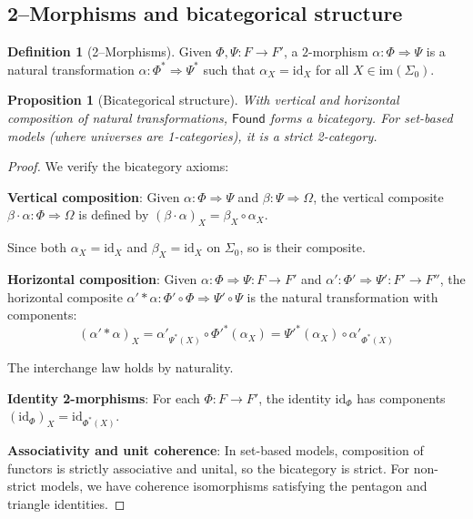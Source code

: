 \documentclass[11pt]{article}
\newtheorem{proposition}[theorem]{Proposition}
\theoremstyle{definition}
\newtheorem{definition}[theorem]{Definition}
\theoremstyle{remark}
\newcommand{\Found}{\mathsf{Found}}
\begin{document}
\subsection{2--Morphisms and bicategorical structure}\label{ssec:Found-2mor}

\begin{definition}[2--Morphisms]
Given \(\Phi,\Psi:F\to F'\), a \(2\)-morphism \(\alpha:\Phi\Rightarrow\Psi\) is a natural transformation \(\alpha:\Phi^*\Rightarrow\Psi^*\) such that \(\alpha_X = \text{id}_X\) for all \(X \in \text{im}(\Sigma_0)\).
\end{definition}

\begin{proposition}[Bicategorical structure]\label{prop:bicat}
With vertical and horizontal composition of natural transformations, \(\Found\) forms a bicategory. For set-based models (where universes are 1-categories), it is a strict 2-category.
\end{proposition}

\begin{proof}
We verify the bicategory axioms:

\textbf{Vertical composition}: Given \(\alpha: \Phi \Rightarrow \Psi\) and \(\beta: \Psi \Rightarrow \Omega\), the vertical composite \(\beta \cdot \alpha: \Phi \Rightarrow \Omega\) is defined by \((\beta \cdot \alpha)_X = \beta_X \circ \alpha_X\).

Since both \(\alpha_X = \text{id}_X\) and \(\beta_X = \text{id}_X\) on \(\Sigma_0\), so is their composite.

\textbf{Horizontal composition}: Given \(\alpha: \Phi \Rightarrow \Psi: F \to F'\) and \(\alpha': \Phi' \Rightarrow \Psi': F' \to F''\), the horizontal composite \(\alpha' * \alpha: \Phi' \circ \Phi \Rightarrow \Psi' \circ \Psi\) is the natural transformation with components:
\[(\alpha' * \alpha)_X = \alpha'_{\Psi^*(X)} \circ \Phi'^*(\alpha_X) = \Psi'^*(\alpha_X) \circ \alpha'_{\Phi^*(X)}\]

The interchange law holds by naturality.

\textbf{Identity 2-morphisms}: For each \(\Phi: F \to F'\), the identity \(\text{id}_\Phi\) has components \((\text{id}_\Phi)_X = \text{id}_{\Phi^*(X)}\).

\textbf{Associativity and unit coherence}: In set-based models, composition of functors is strictly associative and unital, so the bicategory is strict. For non-strict models, we have coherence isomorphisms satisfying the pentagon and triangle identities.
\end{proof}
\end{document}

